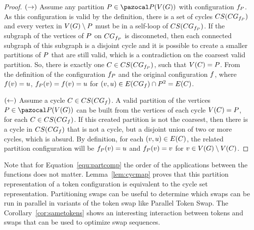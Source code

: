 \documentclass[msc]{ppgccufmg}    %
\begin{document}
\begin{proof}
$(\rightarrow)$ Assume any partition $\partitionElem \in 
\partitionFunc{\vertexFuncG}$ with configuration $f_{P}$. 
As this configuration is valid by the definition, there is a 
set of cycles $CS(CG_{f_
{P}})$ and every vertex in
$V(G) \setminus P$ must be in a self-loop of $CS(CG_{f_{P}})$.
If the subgraph of the vertices of $P$ on $CG_{
f_{P}}$ is disconneted, then each connected subgraph of this
subgraph is a disjoint cycle and it is possible to create a smaller partitions 
of $P$ that are still valid, which is a contradiction on the 
coarsest valid partition.
So, there is exactly one $C \in CS(CG_
{f_{P}})$, such that $V(C) = P$.
From the definition of the configuration $f_{P}$ and the
original configuration $f$, where $f(v) = 
u$, $f_{P}(v) = f(v) = u$ for $(v, u) \in 
E(CG_{f}) \cap P^{2} = E(C)$. 

$(\leftarrow)$ Assume a cycle $C \in CS(CG_{f})$. 
A valid partition of the vertices $\partitionElem \in \partitionFunc
{\vertexFuncG}$ can be built from the vertices of each cycle $V(C) = P$, for each $C \in CS(CG_{f})$.
If this created partition is not the coarsest, then there is a cycle in 
$CS(CG_{f})$ that is not a cycle, but a
disjoint union of two or more cycles, which is absurd.
By definition, for each $(v, u) \in E(C)$, 
the related partition configuration will be $f_
{P}(v) = u$ and $f_
{P}(v) = v$ for $v \in V(G) \setminus 
V(C)$.
\end{proof}

Note that for Equation~\ref{equ:partcomp} the order of the applications
between the functions does not matter.
Lemma~\ref{lem:cycmap} proves that this partition representation of a 
token configuration is equivalent to the cycle set representation.
Partitioning swaps can be useful to determine which swaps can be run
in parallel in variants of the token swap like Parallel Token Swap.
The Corollary~\ref{cor:sametokens} shows an interesting interaction
between tokens and swaps that can be used to optimize swap sequences.
\end{document}
